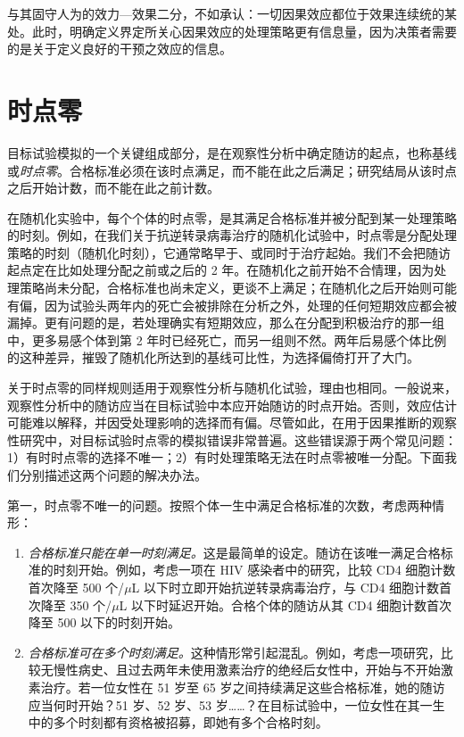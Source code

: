 与其固守人为的效力—效果二分，不如承认：一切因果效应都位于效果连续统的某处。此时，明确定义界定所关心因果效应的处理策略更有信息量，因为决策者需要的是关于定义良好的干预之效应的信息。

\section{时点零}

目标试验模拟的一个关键组成部分，是在观察性分析中确定随访的起点，也称基线或\emph{时点零}。合格标准必须在该时点满足，而不能在此之后满足；研究结局从该时点之后开始计数，而不能在此之前计数。

在随机化实验中，每个个体的时点零，是其满足合格标准并被分配到某一处理策略的时刻。例如，在我们关于抗逆转录病毒治疗的随机化试验中，时点零是分配处理策略的时刻（随机化时刻），它通常略早于、或同时于治疗起始。我们不会把随访起点定在比如处理分配之前或之后的 2 年。在随机化之前开始不合情理，因为处理策略尚未分配，合格标准也尚未定义，更谈不上满足；在随机化之后开始则可能有偏，因为试验头两年内的死亡会被排除在分析之外，处理的任何短期效应都会被漏掉。更有问题的是，若处理确实有短期效应，那么在分配到积极治疗的那一组中，更多易感个体到第 2 年时已经死亡，而另一组则不然。两年后易感个体比例的这种差异，摧毁了随机化所达到的基线可比性，为选择偏倚打开了大门。

关于时点零的同样规则适用于观察性分析与随机化试验，理由也相同。一般说来，观察性分析中的随访应当在目标试验中本应开始随访的时点开始。否则，效应估计可能难以解释，并因受处理影响的选择而有偏。尽管如此，在用于因果推断的观察性研究中，对目标试验时点零的模拟错误非常普遍。这些错误源于两个常见问题：1）有时时点零的选择不唯一；2）有时处理策略无法在时点零被唯一分配。下面我们分别描述这两个问题的解决办法。

第一，时点零不唯一的问题。按照个体一生中满足合格标准的次数，考虑两种情形：

\begin{enumerate}
\item \emph{合格标准只能在单一时刻满足。}这是最简单的设定。随访在该唯一满足合格标准的时刻开始。例如，考虑一项在 HIV 感染者中的研究，比较 CD4 细胞计数首次降至 500 个/$\mu$L 以下时立即开始抗逆转录病毒治疗，与 CD4 细胞计数首次降至 350 个/$\mu$L 以下时延迟开始。合格个体的随访从其 CD4 细胞计数首次降至 500 以下的时刻开始。
\item \emph{合格标准可在多个时刻满足。}这种情形常引起混乱。例如，考虑一项研究，比较无慢性病史、且过去两年未使用激素治疗的绝经后女性中，开始与不开始激素治疗。若一位女性在 51 岁至 65 岁之间持续满足这些合格标准，她的随访应当何时开始？51 岁、52 岁、53 岁……？在目标试验中，一位女性在其一生中的多个时刻都有资格被招募，即她有多个合格时刻。
\end{enumerate}

